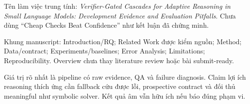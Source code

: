 \documentclass[11pt,a4paper]{article}
\newenvironment{researchnote}[1]
  {\par\addvspace{7pt}\Needspace{4\baselineskip}\begingroup\small
   \noindent{\sffamily\bfseries #1}\par\nobreak\noindent}
  {\par\endgroup\addvspace{5pt}}
\newenvironment{intuitionbox}[1]{\begin{researchnote}{#1}}{\end{researchnote}}
\begin{document}
Tên làm việc trung tính: \emph{Verifier-Gated Cascades for Adaptive Reasoning in Small Language Models: Development Evidence and Evaluation Pitfalls}. Chưa dùng “Cheap Checks Beat Confidence” như kết luận đã chứng minh.

Khung manuscript: Introduction/RQ; Related Work được kiểm nguồn; Method; Data/contract; Experiments/baselines; Error Analysis; Limitations; Reproducibility. Overview chưa thay literature review hoặc bài submit-ready.

\begin{intuitionbox}{Kết luận}
Giá trị rõ nhất là pipeline có raw evidence, QA và failure diagnosis. Claim lợi ích reasoning thích ứng cần fallback cứu được lỗi, prospective contract và đối thủ meaningful như symbolic solver. Kết quả âm vẫn hữu ích nếu báo đúng phạm vi.
\end{intuitionbox}

\appendix
\end{document}
